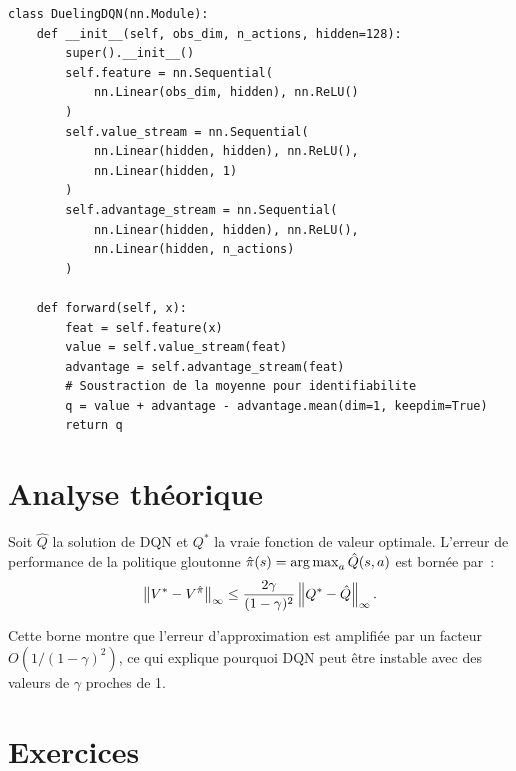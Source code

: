 \begin{codeblock}[title=\textbf{Architecture Dueling DQN}]
\begin{verbatim}
class DuelingDQN(nn.Module):
    def __init__(self, obs_dim, n_actions, hidden=128):
        super().__init__()
        self.feature = nn.Sequential(
            nn.Linear(obs_dim, hidden), nn.ReLU()
        )
        self.value_stream = nn.Sequential(
            nn.Linear(hidden, hidden), nn.ReLU(),
            nn.Linear(hidden, 1)
        )
        self.advantage_stream = nn.Sequential(
            nn.Linear(hidden, hidden), nn.ReLU(),
            nn.Linear(hidden, n_actions)
        )

    def forward(self, x):
        feat = self.feature(x)
        value = self.value_stream(feat)
        advantage = self.advantage_stream(feat)
        # Soustraction de la moyenne pour identifiabilite
        q = value + advantage - advantage.mean(dim=1, keepdim=True)
        return q
\end{verbatim}
\end{codeblock}

\section{Analyse th\'eorique}

\begin{theoreme}
Soit $\hat{Q}$ la solution de DQN et $Q^*$ la vraie fonction de valeur optimale.
L'erreur de performance de la politique gloutonne $\hat{\pi}(s) = \operatorname*{arg\,max}_a \hat{Q}(s,a)$
est born\'ee par~:
\[
    \left\| V^* - V^{\hat{\pi}} \right\|_\infty \leq \frac{2\gamma}{(1-\gamma)^2}
    \left\| Q^* - \hat{Q} \right\|_\infty.
\]
\end{theoreme}

\begin{remarque}
Cette borne montre que l'erreur d'approximation est amplifi\'ee par un facteur
$O(1/(1-\gamma)^2)$, ce qui explique pourquoi DQN peut \^etre instable avec
des valeurs de $\gamma$ proches de 1.
\end{remarque}

\section{Exercices}

